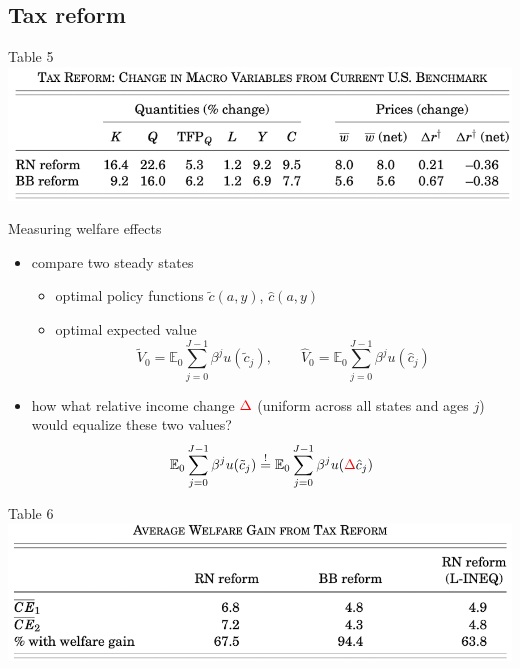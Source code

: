 \documentclass[aspectratio=169,mathserif]{beamer}
\begin{document}
\subsection{Tax reform}

\begin{frame}{Table 5}
    \centering
    \includegraphics[scale = 0.4]{GKKOC_Tab5.png}
\end{frame}

\begin{frame}{Measuring welfare effects}

    \begin{itemize}
        \item compare two steady states
        \begin{itemize}
            \item optimal policy functions $\tilde c(a, y)$, $\hat c(a, y)$
            \item optimal expected value
            $$\tilde V_0 = \mathbb{E}_0 \sum_{j=0}^{J-1} \beta^j u(\tilde c_j), \qquad \hat V_0 = \mathbb{E}_0 \sum_{j=0}^{J-1} \beta^j u(\hat c_j)$$
        \end{itemize}
        \item how what relative income change $\textcolor{red}{\Delta}$ (uniform across all states and ages $j$) would equalize these two values?
        \begin{equation*}
            \mathbb{E}_0 \sum_{j=0}^{J-1} \beta^j u(\tilde c_j) \stackrel{!}{=} \mathbb{E}_0 \sum_{j=0}^{J-1} \beta^j u(\textcolor{red}{\Delta} \hat c_j)
        \end{equation*}
    \end{itemize}
\end{frame}


\begin{frame}{Table 6}
    \centering
    \includegraphics[scale = 0.4]{GKKOC_Tab6.png}
\end{frame}
\end{document}
